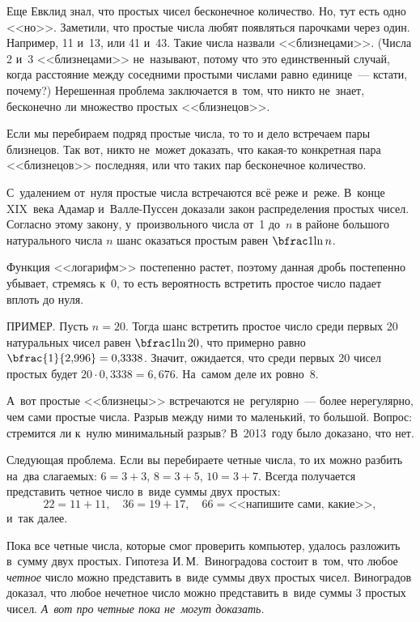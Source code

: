 Еще Евклид знал, что простых чисел бесконечное количество. Но, тут есть одно <<но>>. Заметили, что
простые числа любят появляться парочками через один. Например, 11 и~13, или 41 и~43. Такие числа
назвали <<близнецами>>. (Числа 2 и~3 <<близнецами>> не~называют, потому что это единственный
случай, когда расстояние между соседними простыми числами равно единице~--- кстати, почему?)
Нерешенная проблема заключается в~том, что никто не~знает, бесконечно ли множество простых
<<близнецов>>.


Если мы перебираем подряд простые числа, то то и дело встречаем пары близнецов. Так вот, никто не~может
доказать, что какая-то конкретная пара <<близнецов>> последняя, или что таких пар бесконечное
количество.

С~удалением от~нуля простые числа встречаются всё реже и~реже. В~конце XIX~века Адамар
и~Валле-Пуссен доказали закон распределения простых чисел. Согласно этому закону, у~произвольного
числа от~1 до~$n$ в районе большого натурального числа $n$  шанс оказаться простым равен $\bfrac1{\ln n}$.


Функция <<логарифм>> постепенно растет, поэтому данная дробь постепенно убывает, стремясь к~0, то
есть вероятность встретить простое число падает вплоть до нуля.


ПРИМЕР. Пусть $n=20$. Тогда шанс встретить простое число среди первых 20 натуральных чисел равен $\bfrac1{\ln 20}$,
что примерно равно $\bfrac{1}{2{,}996} = 0{,}3338$. Значит, ожидается, что среди первых 20 чисел
простых будет $20\cdot0{,}3338 = 6{,}676$. На~самом деле их ровно~8.

\pagebreak

А~вот простые <<близнецы>> встречаются не~регулярно~--- более нерегулярно, чем сами простые числа.
Разрыв между ними то маленький, то большой. Вопрос: стремится ли к~нулю минимальный разрыв? В~2013~году было доказано, что нет.

Следующая проблема. Если вы перебираете четные числа, то их можно разбить на~два слагаемых:
$6=3+3$,
$8=3+5$,
$10=3+7$.
Всегда получается представить четное число в~виде суммы двух простых:
$$
22=11+11,\quad
36=19+17,\quad
66 = \text{<<напишите сами, какие>>},
$$
и~так далее.

Пока все четные числа, которые смог проверить компьютер, удалось разложить в~сумму двух простых.
Гипотеза И.\,М.~Виноградова состоит в~том, что любое \textit{четное} число можно представить в~виде суммы
двух простых чисел. Виноградов доказал, что любое нечетное число можно представить в~виде суммы 3
простых чисел. \textit{А~вот про четные пока не~могут доказать.}

